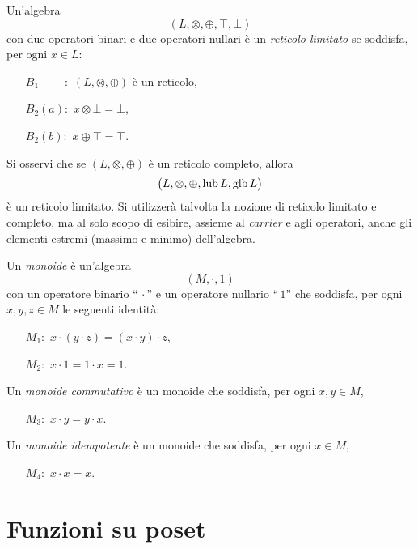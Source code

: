 \begin{definizione}  
{\rm \cite{BurrisS81}} Un'algebra
\[
    (L, \otimes, \oplus, \top, \bot)
\]
con due operatori binari e due operatori nullari
\`e un \emph{reticolo limitato} se soddisfa, per ogni $x \in L$:
\begin{itemize}
\item[$B_1 \phantom{(a)}:$] $(L, \otimes, \oplus)$ \`e un reticolo,
\item[$B_2 (a):$] $x \otimes \bot = \bot$,
\item[$B_2 (b):$] $x \oplus  \top = \top$.
\end{itemize}
\end{definizione}
Si osservi che se $(L, \otimes, \oplus)$ \`e un reticolo completo, allora
\[
    \bigl(L, \otimes, \oplus, \mathop{\mathrm{lub}}\nolimits L, \mathop{\mathrm{glb}}\nolimits L\bigr)
\]
\`e un reticolo limitato.
Si utilizzer\`a talvolta la nozione di reticolo limitato e
completo, ma al solo scopo di esibire, assieme al \emph{carrier} e agli
operatori, anche gli elementi estremi (massimo e minimo) dell'algebra.

\begin{definizione}  
Un \emph{monoide} \`e un'algebra
\[
    (M, \cdot, 1)
\]
con un operatore binario ``$\,\cdot$'' e un operatore nullario ``$\,1$'' che
soddisfa, per ogni $x,y,z\in M$ le seguenti identit\`a:
\begin{itemize}
\item[$M_1:$] $x \cdot (y \cdot z) = (x \cdot y) \cdot z$,
\item[$M_2:$] $x \cdot 1 = 1 \cdot x = 1$.
\end{itemize}
Un \emph{monoide commutativo} \`e un monoide che soddisfa, per ogni $x,y \in M$,
\begin{itemize}
\item[$M_3:$] $x \cdot y = y \cdot x$.
\end{itemize}
Un \emph{monoide idempotente} \`e un monoide che soddisfa, per ogni $x \in M$,
\begin{itemize}
\item[$M_4:$] $x \cdot x = x$.
\end{itemize}
\end{definizione}

\section{Funzioni su poset}

